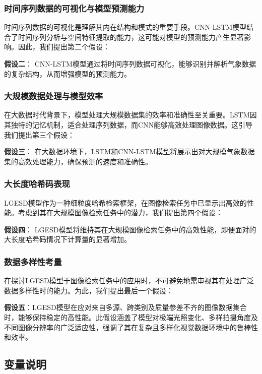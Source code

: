 \subsubsection{时间序列数据的可视化与模型预测能力}

时间序列数据的可视化是理解其内在结构和模式的重要手段。CNN-LSTM模型结合了时间序列分析与空间特征提取的能力，这可能对模型的预测能力产生显著影响。因此，我们提出第二个假设：

\textbf{假设二}： CNN-LSTM模型通过将时间序列数据可视化，能够识别并解析气象数据的复杂结构，从而增强模型的预测能力。

\subsubsection{大规模数据处理与模型效率}

在大数据时代背景下，模型处理大规模数据集的效率和准确性至关重要。LSTM因其独特的记忆机制，适合处理序列数据，而CNN能够高效处理图像数据。这引导我们提出第三个假设：

\textbf{假设三}： 在大数据环境下，LSTM和CNN-LSTM模型将展示出对大规模气象数据集的高效处理能力，确保预测的速度和准确性。

\subsubsection{大长度哈希码表现}

LGESD模型作为一种细粒度哈希检索框架，在图像检索任务中已显示出高效的性能。考虑到其在大规模图像检索任务中的潜力，我们提出第四个假设：

\textbf{假设四}： LGESD模型将维持其在大规模图像检索任务中的高效性能，即便面对的大长度哈希码情况下计算量的显著增加。

\subsubsection{数据多样性考量}

在探讨LGESD模型于图像检索任务中的应用时，不可避免地需审视其在处理广泛数据多样性时的能力。为此，我们提出最后一个假设：

\textbf{假设五}：LGESD模型在应对来自多源、跨类别及质量参差不齐的图像数据集合时，能够保持稳定的高性能。此假设涵盖了模型对极端光照变化、多样拍摄角度及不同图像分辨率的广泛适应性，强调了其在复杂且多样化视觉数据环境中的鲁棒性和效率。

\subsection{变量说明}

